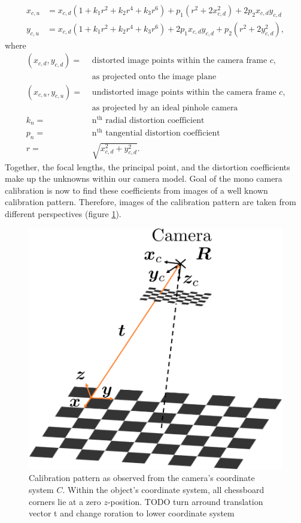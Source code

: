 \begin{align}
	x_{c,u} &= x_{c,d}(1+k_1r^2+k_2r^4+k_3r^6) + p_1(r^2+2x_{c,d}^2) + 2p_2x_{c,d}y_{c,d} 
	\label{eq::324_x_dist}\\
	y_{c,u} &= x_{c,d}(1+k_1r^2+k_2r^4+k_3r^6) + 2p_1x_{c,d}y_{c,d} + p_2(r^2+2y_{c,d}^2),
	\label{eq::324_y_dist}
\end{align}
where
\begin{align}
	(x_{c,d}, y_{c,d}) = &\,\,\text{distorted image points within the camera frame $c$,} 
	\nonumber\\
		                 &\,\,\text{as projected onto the image plane}
	\nonumber\\ 
	(x_{c,u}, y_{c,u}) = &\,\,\text{undistorted image points within the camera frame $c$,}
	\nonumber\\
	                     &\,\,\text{as projected by an ideal pinhole camera}
	\nonumber\\
	k_n = &\,\,\text{n$^\text{th}$ radial distortion coefficient}
	\nonumber\\
	p_n = &\,\,\text{n$^\text{th}$ tangential distortion coefficient}
	\nonumber\\
	r = &\,\,\sqrt{x_{c,d}^2+y_{c,d}^2}.
	\nonumber
\end{align}
Together, the focal lengths, the principal point, and the distortion coefficients make up the unknowns within our camera model. Goal of the mono camera calibration is now to find these coefficients from images of a well known calibration pattern. Therefore, images of the calibration pattern are taken from different perspectives (figure \ref{fig::324_calibration_process}). 
\begin{figure}[h]
	\centering
	\includegraphics[scale=.28]{chapters/03_background/img/calibration_process.png}
	\caption{Calibration pattern as observed from the camera's coordinate system $C$. Within the object's coordinate system, all chessboard corners lie at a zero $z$-position. TODO turn arround translation vector t and change roration to lower coordinate system}
	\label{fig::324_calibration_process}
\end{figure}
